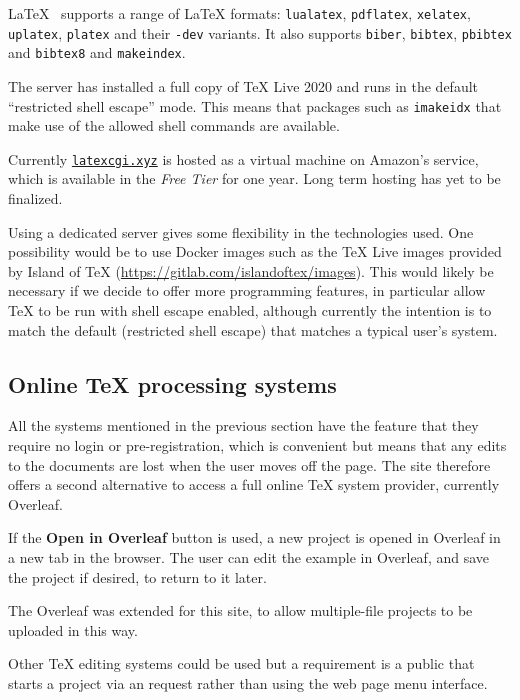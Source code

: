\documentclass[final]{ltugboat}
\begin{document}
\LaTeX{}~ supports a range of \LaTeX{} formats:
\texttt{lualatex}, \texttt{pdflatex}, \texttt{xelatex},
\texttt{uplatex}, \texttt{platex} and their \texttt{-dev} variants. It also
supports \texttt{biber}, \texttt{bibtex}, \texttt{pbibtex} and \texttt{bibtex8} and \texttt{makeindex}.
{\hfuzz=2.7pt\par}

The server has installed a full copy of \TeX{} Live 2020 and runs in
the default \enquote{restricted shell escape} mode. This means that packages
 such as \texttt{imakeidx} that make use of the allowed shell commands
are available.

Currently \href{https://latexcgi.xyz}{\nolinkurl{latexcgi.xyz}} is hosted as a virtual machine on
Amazon's  service, which is available in the \emph{Free Tier} for one
year. Long term hosting has yet to be finalized.

Using a dedicated server gives some flexibility in the technologies
used.  One possibility would be to use Docker images such as the
\TeX{} Live images provided by 
Island of \TeX{}
(\url{https://gitlab.com/islandoftex/images}).  This
would likely be necessary if we decide to offer more programming
features, in particular allow \TeX{} to be run with shell escape
enabled, although currently the intention is to match the default
(restricted shell escape) that matches a typical user's system.

\subsection{Online \TeX{} processing systems}

All the systems mentioned in the previous section have the feature that
they require no login or pre-registration, which is convenient but
means that any edits to the documents are lost when the user moves off
the page.  The site therefore offers a second alternative to access a
full online \TeX{} system provider, currently Overleaf.

If the \textbf{Open in Overleaf} button is used, a new project is
opened in Overleaf in a new tab in the browser. The user can edit the
example in Overleaf, and save the project if desired, to return to it later.

The Overleaf  was extended for this site, to allow multiple-file
projects to be uploaded in this way.

Other \TeX{} editing systems could be used but a requirement is a
public  that starts a project via an  request rather than using
the web page menu interface.
\end{document}
